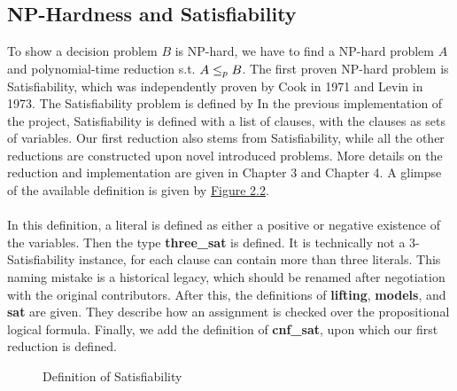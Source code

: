 \subsection{NP-Hardness and Satisfiability}
To show a decision problem $B$ is NP-hard, 
we have to find a NP-hard problem $A$ and polynomial-time reduction 
s.t. $A \leq_p B$. The first proven NP-hard problem is Satisfiability, 
which was independently proven by Cook in 1971 and Levin in 1973. 
The Satisfiability problem is defined by 
In the previous implementation of the project, Satisfiability is defined with a list of clauses, with the clauses as sets of variables.
Our first reduction also stems from Satisfiability, while all the other reductions are constructed upon novel introduced problems. 
More details on the reduction and implementation are given in Chapter 3 and Chapter 4. A glimpse of the available 
definition is given by \hyperref[figure:2]{Figure 2.2}. \\\\
In this definition, a literal is defined as either a positive or negative existence of the variables. Then 
the type \textbf{three\_sat} is defined. It is technically not a 3-Satisfiability instance, for each clause can 
contain more than three literals. This naming mistake is a historical legacy, which should be renamed after negotiation with the original contributors.
After this, the definitions of \textbf{lifting}, \textbf{models}, and \textbf{sat} are given. They describe how an assignment is checked over the propositional 
logical formula. Finally, we add the definition of \textbf{cnf\_sat}, upon which our first reduction is defined.
\begin{figure}[!h]
    \caption{Definition of Satisfiability}
    \label{figure:2}
\end{figure}

